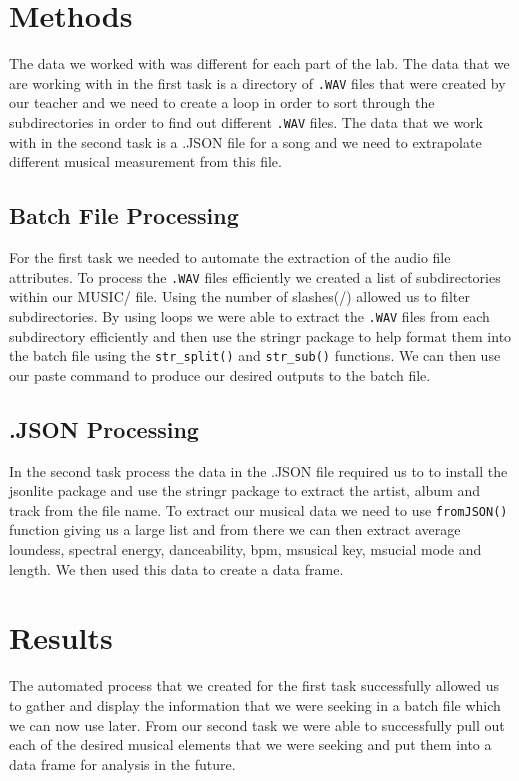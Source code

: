\documentclass{article}\usepackage[]{graphicx}\usepackage[]{xcolor}
\begin{document}
\begin{multicols}{2}
\section{Methods}
The data we worked with was different for each part of the lab. The data that we are working with in the first task is a directory of {\tt{.WAV}} files that were created by our teacher and we need to create a loop in order to sort through the subdirectories in order to find out different {\tt{.WAV}} files. The data that we work with in the second task is a .JSON file for a song and we need to extrapolate different musical measurement from this file.

\subsection{Batch File Processing}
For the first task we needed to automate the extraction of the audio file attributes. To process the {\tt{.WAV}} files efficiently we created a list of subdirectories within our MUSIC/ file. Using the number of slashes(/) allowed us to filter subdirectories. By using loops we were able to extract the {\tt{.WAV}} files from each subdirectory efficiently and then use the stringr package \citep{stringr} to help format them into the batch file using the \verb|str_split()| and \verb|str_sub()| functions. We can then use our paste command to produce our desired outputs to the batch file. 


\subsection{.JSON Processing}
In the second task process the data in the .JSON file required us to to install the jsonlite package \citep{jsonlite} and use the stringr package to extract the artist, album and track from the file name. To extract our musical data we need to use {\tt{fromJSON()}} function giving us a large list and from there we can then extract average loundess, spectral energy, danceability, bpm, msusical key, msucial mode and length. We then used this data to create a data frame. 



\section{Results}
The automated process that we created for the first task successfully allowed us to gather and display the information that we were seeking in a batch file which we can now use later. From our second task we were able to successfully pull out each of the desired musical elements that we were seeking and put them into a data frame for analysis in the future.  




\end{multicols}
\end{document}
